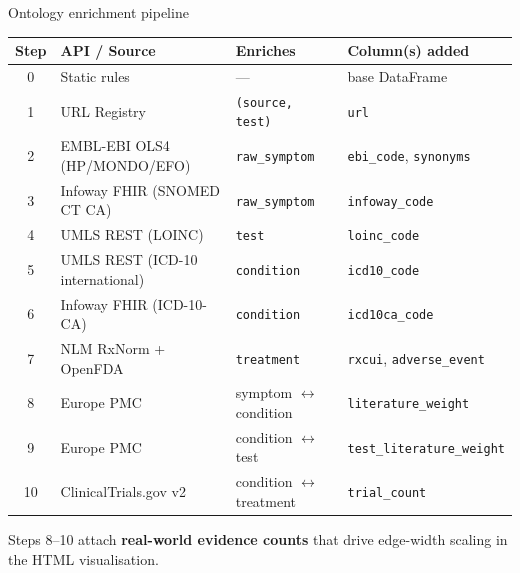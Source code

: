 \documentclass[aspectratio=169]{beamer}
\begin{document}
\begin{frame}{Ontology enrichment pipeline}
  \scriptsize
  \begin{tabular}{@{}clll@{}}
    \toprule
    \textbf{Step} & \textbf{API / Source} & \textbf{Enriches} & \textbf{Column(s) added} \\
    \midrule
    0 & Static rules          & ---               & base DataFrame \\
    1 & URL Registry                  & \texttt{(source, test)} & \texttt{url} \\
    2 & EMBL-EBI OLS4 (HP/MONDO/EFO) & \texttt{raw\_symptom} & \texttt{ebi\_code}, \texttt{synonyms} \\
    3 & Infoway FHIR (SNOMED CT CA)  & \texttt{raw\_symptom} & \texttt{infoway\_code} \\
    4 & UMLS REST (LOINC)            & \texttt{test}         & \texttt{loinc\_code} \\
    5 & UMLS REST (ICD-10 international) & \texttt{condition} & \texttt{icd10\_code} \\
    6 & Infoway FHIR (ICD-10-CA)     & \texttt{condition}    & \texttt{icd10ca\_code} \\
    7 & NLM RxNorm + OpenFDA         & \texttt{treatment}    & \texttt{rxcui}, \texttt{adverse\_event} \\
    8 & Europe PMC                   & symptom \(\leftrightarrow\) condition & \texttt{literature\_weight} \\
    9 & Europe PMC                   & condition \(\leftrightarrow\) test & \texttt{test\_literature\_weight} \\
    10 & ClinicalTrials.gov v2       & condition \(\leftrightarrow\) treatment & \texttt{trial\_count} \\
    \bottomrule
  \end{tabular}

  \vspace{0.4em}
  Steps 8--10 attach \textbf{real-world evidence counts} that drive edge-width
  scaling in the HTML visualisation.
\end{frame}
\end{document}
